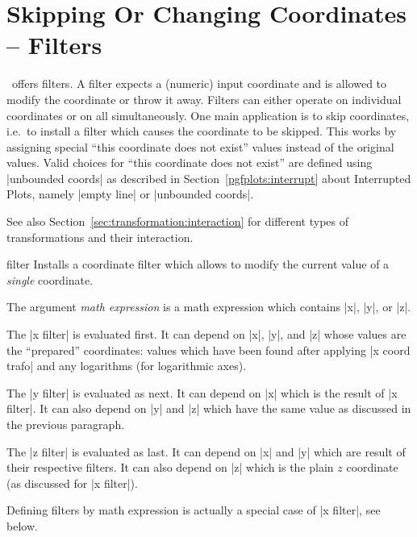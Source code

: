 \section{Skipping Or Changing Coordinates -- Filters}
\label{sec:filters}

\PGFPlots\ offers filters. A filter expects a (numeric) input coordinate and is allowed to modify the coordinate or throw it away. Filters can either operate on individual coordinates or on all simultaneously. One main application is to skip coordinates, i.e.\ to install a filter which causes the coordinate to be skipped. This works by assigning special ``this coordinate does not exist'' values instead of the original values. Valid choices for ``this coordinate does not exist'' are defined using |unbounded coords| as described in Section~\ref{pgfplots:interrupt} about Interrupted Plots, namely |empty line| or |unbounded coords|.

See also Section~\ref{sec:transformation:interaction} for different types of transformations and their interaction.

\begin{pgfplotsxyexpressionkeylist}{\x\space filter}
	Installs a coordinate filter which allows to modify the current value of a \emph{single} coordinate.

	The argument \emph{math expression} is a math expression which contains |x|, |y|, or |z|. 
\begin{codeexample}[]
\end{codeexample}
	
	The |x filter| is evaluated first. It can depend on |x|, |y|, and |z| whose values are the ``prepared'' coordinates: values which have been found after applying |x coord trafo| and any logarithms (for logarithmic axes).

	The |y filter| is evaluated as next. It can depend on |x| which is the result of |x filter|. It can also depend on |y| and |z| which have the same value as discussed in the previous paragraph.

	The |z filter| is evaluated as last. It can depend on |x| and |y| which are result of their respective filters. It can also depend on |z| which is the plain $z$ coordinate (as discussed for |x filter|).

	Defining filters by math expression is actually a special case of |x filter|, see below.
\end{pgfplotsxyexpressionkeylist}

